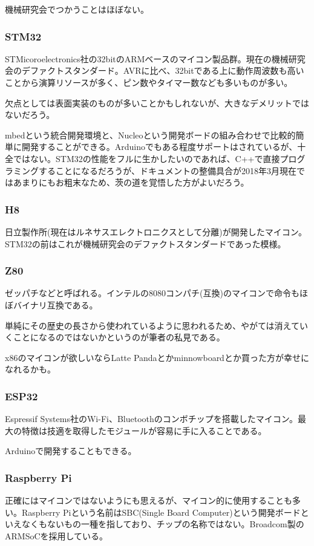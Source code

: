 \documentclass[a4paper,titlepage,here]{ujarticle}
\begin{document}
機械研究会でつかうことはほぼない。
\subsubsection{STM32}
STMicoroelectronics社の32bitのARMベースのマイコン製品群。現在の機械研究会のデファクトスタンダード。AVRに比べ、32bitである上に動作周波数も高いことから演算リソースが多く、ピン数やタイマー数なども多いものが多い。

欠点としては表面実装のものが多いことかもしれないが、大きなデメリットではないだろう。

mbedという統合開発環境と、Nucleoという開発ボードの組み合わせで比較的簡単に開発することができる。Arduinoでもある程度サポートはされているが、十全ではない。STM32の性能をフルに生かしたいのであれば、C++で直接プログラミングすることになるだろうが、ドキュメントの整備具合が2018年3月現在ではあまりにもお粗末なため、茨の道を覚悟した方がよいだろう。
\subsubsection{H8}
日立製作所(現在はルネサスエレクトロニクスとして分離)が開発したマイコン。STM32の前はこれが機械研究会のデファクトスタンダードであった模様。
\subsubsection{Z80}
ゼッパチなどと呼ばれる。インテルの8080コンパチ(互換)のマイコンで命令もほぼバイナリ互換である。

単純にその歴史の長さから使われているように思われるため、やがては消えていくことになるのではないかというのが筆者の私見である。

x86のマイコンが欲しいならLatte Pandaとかminnowboardとか買った方が幸せになれるかも。
\subsubsection{ESP32}
Espressif Systems社のWi-Fi、Bluetoothのコンボチップを搭載したマイコン。最大の特徴は技適を取得したモジュールが容易に手に入ることである。

Arduinoで開発することもできる。
\subsubsection{Raspberry Pi}
正確にはマイコンではないようにも思えるが、マイコン的に使用することも多い。Raspberry Piという名前はSBC(Single Board Computer)という開発ボードといえなくもないもの一種を指しており、チップの名称ではない。Broadcom製のARMSoCを採用している。
\end{document}
